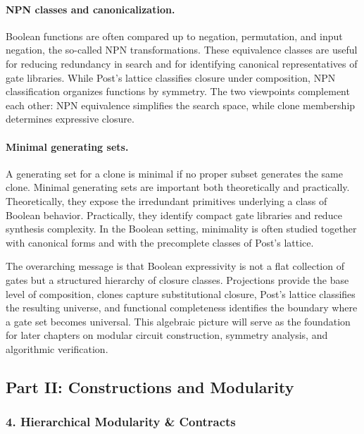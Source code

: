 \documentclass[11pt]{article}
\begin{document}
\paragraph{NPN classes and canonicalization.}
Boolean functions are often compared up to negation, permutation, and input negation, the so-called NPN transformations. These equivalence classes are useful for reducing redundancy in search and for identifying canonical representatives of gate libraries. While Post's lattice classifies closure under composition, NPN classification organizes functions by symmetry. The two viewpoints complement each other: NPN equivalence simplifies the search space, while clone membership determines expressive closure.

\paragraph{Minimal generating sets.}
A generating set for a clone is minimal if no proper subset generates the same clone. Minimal generating sets are important both theoretically and practically. Theoretically, they expose the irredundant primitives underlying a class of Boolean behavior. Practically, they identify compact gate libraries and reduce synthesis complexity. In the Boolean setting, minimality is often studied together with canonical forms and with the precomplete classes of Post's lattice.

The overarching message is that Boolean expressivity is not a flat collection of gates but a structured hierarchy of closure classes. Projections provide the base level of composition, clones capture substitutional closure, Post's lattice classifies the resulting universe, and functional completeness identifies the boundary where a gate set becomes universal. This algebraic picture will serve as the foundation for later chapters on modular circuit construction, symmetry analysis, and algorithmic verification.



\subsection{Part II: Constructions and Modularity}

\subsubsection{4. Hierarchical Modularity \& Contracts}
\end{document}
